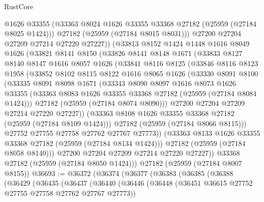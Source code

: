 \begin{lexlean}{RustCore}
\begin{coremodule}
          @1626
          @33355
          (@33363 @8024 @1626 @33355 @33368 @27182 (@25959 (@27184 @8025 @1424)))
          @27182
          (@25959 (@27184 @8015 @8031)))
        @27200
        @27204
        @27209
        @27214
        @27220
        @27227))
    (@33813
      @8152
      @1424
      @1448
      @1616
      @8049
      @1626
      (@33821
        @8141
        @8150
        (@33826
          @8141
          @8148
          @1671
          (@33833
            @8127
            @8140
            @8147
            @1616
            @8057
            @1626
            (@33841
              @8116
              @8125
              (@33846
                @8116
                @8123
                @1958
                (@33852
                  @8102
                  @8115
                  @8122
                  @1616
                  @8065
                  @1626
                  (@33330
                    @8091
                    @8100
                    (@33335
                      @8091
                      @8098
                      @1671
                      (@33343
                        @8090
                        @8097
                        @1616
                        @8073
                        @1626
                        @33355
                        (@33363 @8083 @1626 @33355 @33368 @27182 (@25959 (@27184 @8084 @1424)))
                        @27182
                        (@25959 (@27184 @8074 @8090)))
                      @27200
                      @27204
                      @27209
                      @27214
                      @27220
                      @27227))
                  (@33363 @8108 @1626 @33355 @33368 @27182 (@25959 (@27184 @8109 @1424)))
                  @27182
                  (@25959 (@27184 @8066 @8115)))
                @27752
                @27755
                @27758
                @27762
                @27767
                @27773))
            (@33363 @8133 @1626 @33355 @33368 @27182 (@25959 (@27184 @8134 @1424)))
            @27182
            (@25959 (@27184 @8058 @8140)))
          @27200
          @27204
          @27209
          @27214
          @27220
          @27227))
      @33368
      @27182
      (@25959 (@27184 @8050 @1424)))
    @27182
    (@25959 (@27184 @8007 @8155))
@36693 := @36372
    (@36374
      (@36377
        (@36383
          (@36385
            (@36388
              (@36429
                (@36435
                  (@36437
                    (@36440
                      (@36446
                        (@36448 (@36451 @36615 @27752 @27755 @27758 @27762 @27767 @27773))

\end{coremodule}
\end{lexlean}
